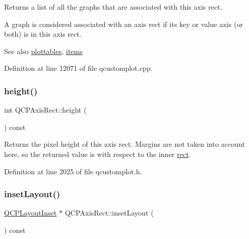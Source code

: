 Returns a list of all the graphs that are associated with this axis rect.

A graph is considered associated with an axis rect if its key or value axis (or both) is in this axis rect.

\begin{DoxySeeAlso}{See also}
\hyperlink{class_q_c_p_axis_rect_a587d073a97b27bc7293fab4b2774ad59}{plottables}, \hyperlink{class_q_c_p_axis_rect_a03c113a2175448300ee8f944e24776ba}{items} 
\end{DoxySeeAlso}


Definition at line 12071 of file qcustomplot.\+cpp.

\mbox{\label{class_q_c_p_axis_rect_acc4377809e79d9a089ab790f39429b0d}} 
\subsubsection{\texorpdfstring{height()}{height()}}
{\footnotesize\ttfamily int Q\+C\+P\+Axis\+Rect\+::height (\begin{DoxyParamCaption}{ }\end{DoxyParamCaption}) const\hspace{0.3cm}{\ttfamily [inline]}}

Returns the pixel height of this axis rect. Margins are not taken into account here, so the returned value is with respect to the inner \hyperlink{class_q_c_p_layout_element_a208effccfe2cca4a0eaf9393e60f2dd4}{rect}. 

Definition at line 2025 of file qcustomplot.\+h.

\mbox{\label{class_q_c_p_axis_rect_a949f803466619924c7018df4b511ae10}} 
\subsubsection{\texorpdfstring{inset\+Layout()}{insetLayout()}}
{\footnotesize\ttfamily \hyperlink{class_q_c_p_layout_inset}{Q\+C\+P\+Layout\+Inset} $\ast$ Q\+C\+P\+Axis\+Rect\+::inset\+Layout (\begin{DoxyParamCaption}{ }\end{DoxyParamCaption}) const\hspace{0.3cm}{\ttfamily [inline]}}

